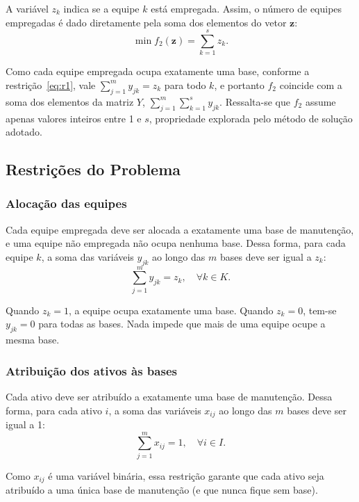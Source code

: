 \documentclass[conference]{IEEEtran}
\begin{document}
A variável $z_k$ indica se a equipe $k$ está empregada. Assim, o número de equipes empregadas é dado diretamente pela soma dos elementos do vetor $\mathbf{z}$:
\begin{equation}
\min f_2(\mathbf{z}) = \sum_{k=1}^{s} z_k.
\label{eq:f2}
\end{equation}

Como cada equipe empregada ocupa exatamente uma base, conforme a restrição~\eqref{eq:r1}, vale $\sum_{j=1}^{m} y_{jk} = z_k$ para todo $k$, e portanto $f_2$ coincide com a soma dos elementos da matriz $Y$, $\sum_{j=1}^{m}\sum_{k=1}^{s} y_{jk}$. Ressalta-se que $f_2$ assume apenas valores inteiros entre 1 e $s$, propriedade explorada pelo método de solução adotado.

\subsection{Restrições do Problema}

\subsubsection{Alocação das equipes}
Cada equipe empregada deve ser alocada a exatamente uma base de manutenção, e uma equipe não empregada não ocupa nenhuma base. Dessa forma, para cada equipe $k$, a soma das variáveis $y_{jk}$ ao longo das $m$ bases deve ser igual a $z_k$:
\begin{equation}
\sum_{j=1}^{m} y_{jk} = z_k, \quad \forall k \in K.
\label{eq:r1}
\end{equation}

Quando $z_k = 1$, a equipe ocupa exatamente uma base. Quando $z_k = 0$, tem-se $y_{jk} = 0$ para todas as bases. Nada impede que mais de uma equipe ocupe a mesma base.

\subsubsection{Atribuição dos ativos às bases}
Cada ativo deve ser atribuído a exatamente uma base de manutenção. Dessa forma, para cada ativo $i$, a soma das variáveis $x_{ij}$ ao longo das $m$ bases deve ser igual a 1:
\begin{equation}
\sum_{j=1}^{m} x_{ij} = 1, \quad \forall i \in I.
\label{eq:r2}
\end{equation}

Como $x_{ij}$ é uma variável binária, essa restrição garante que cada ativo seja atribuído a uma única base de manutenção (e que nunca fique sem base).
\end{document}
